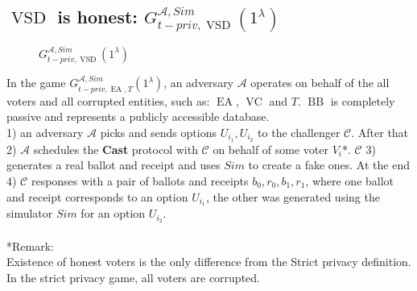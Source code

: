 \documentclass[12pt]{article}
\DeclareMathOperator{\vsd}{VSD}
\DeclareMathOperator{\ea}{EA}
\DeclareMathOperator{\bb}{BB}
\DeclareMathOperator{\voc}{VC}
\begin{document}
\subsection{$\vsd$ is honest: $G_{t-priv,\vsd}^{\mathcal{A},Sim}(1^{\lambda})$}
     \begin{figure}[h!]
 
        \caption{ $G_{t-priv,\vsd}^{\mathcal{A},Sim}(1^{\lambda})$}
\end{figure}

 In the game $G_{t-priv,\ea,T}^{\mathcal{A}, Sim}(1^{\lambda})$, an adversary $\mathcal{A}$  operates on behalf of the all voters and all corrupted entities, such as:  $\ea$, $\voc$ and $T$. $\bb$ is completely passive and represents a publicly accessible database.\\
 1) an adversary $\mathcal{A}$ picks and sends options $U_{i_1}, U_{i_2}$ to the challenger $\mathcal{C}$.  After that 2) $\mathcal{A}$ schedules the \textbf{Cast} protocol with $\mathcal{C}$ on behalf of some voter $V_i$*. $\mathcal{C}$ 3) generates a real ballot and receipt and uses $Sim$ to create a fake ones.  At the end 4) $\mathcal{C}$ responses with a pair of ballots and receipts $b_0,r_0,b_1,r_1$, where one ballot and receipt corresponds to an option $U_{i_1}$, the other was generated using the simulator $Sim$ for an option $U_{i_2}$. \\\\
 *Remark:\\
 Existence of honest voters  is the only difference from the Strict privacy definition. In the strict privacy game, all voters are corrupted. 
 
\end{document}
